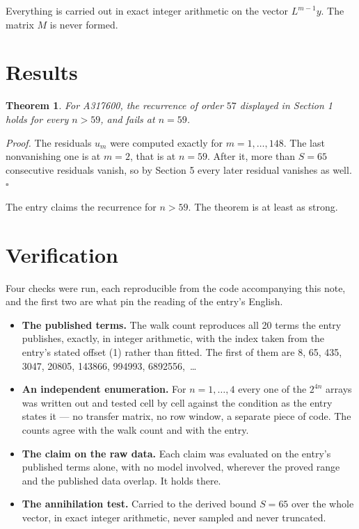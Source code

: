 \documentclass[11pt]{article}
\newtheorem{theorem}{Theorem}
\theoremstyle{definition}
\begin{document}
Everything is carried out in exact integer arithmetic on the vector $L^{m-1}y$. The matrix $M$ is never formed.

\section{Results}

\begin{theorem} For A317600, the recurrence of order $57$ displayed in Section 1 holds for every $n > 59$, and fails at $n = 59$.\end{theorem}

{\itshape Proof.} The residuals $u_m$ were computed exactly for $m = 1,\dots,148$. The last nonvanishing one is at $m = 2$, that is at $n = 59$. After it, more than $S = 65$ consecutive residuals vanish, so by Section 5 every later residual vanishes as well. $\square$

The entry claims the recurrence for $n > 59$. The theorem is at least as strong.

\section{Verification}

Four checks were run, each reproducible from the code accompanying this note, and the first two are what pin the reading of the entry's English.

\begin{itemize}

\item {\bfseries The published terms.} The walk count reproduces all 20 terms the entry publishes, exactly, in integer arithmetic, with the index taken from the entry's stated offset (1) rather than fitted. The first of them are 8, 65, 435, 3047, 20805, 143866, 994993, 6892556,~\dots

\item {\bfseries An independent enumeration.} For $n = 1,\dots,4$ every one of the $2^{4n}$ arrays was written out and tested cell by cell against the condition as the entry states it --- no transfer matrix, no row window, a separate piece of code. The counts agree with the walk count and with the entry.

\item {\bfseries The claim on the raw data.} Each claim was evaluated on the entry's published terms alone, with no model involved, wherever the proved range and the published data overlap. It holds there.

\item {\bfseries The annihilation test.} Carried to the derived bound $S = 65$ over the whole vector, in exact integer arithmetic, never sampled and never truncated.

\end{itemize}
\end{document}
